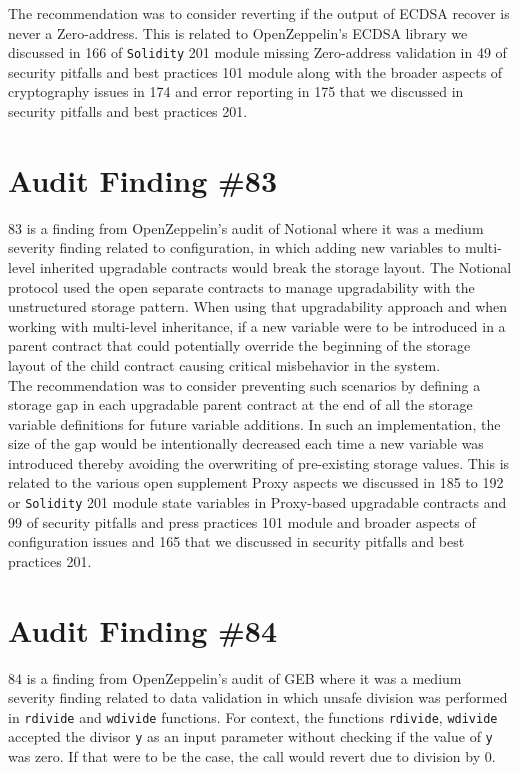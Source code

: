 The recommendation was to consider reverting if the output of ECDSA recover is never a Zero-address. This is related to OpenZeppelin's ECDSA library we discussed in 166 of \verb|Solidity| 201 module missing Zero-address validation in 49 of security pitfalls and best practices 101 module along with the broader aspects of cryptography issues in 174 and error reporting in 175 that we discussed in security pitfalls and best practices 201.

\section{Audit Finding \#83}

83 is a finding from OpenZeppelin's audit of Notional where it was a medium severity finding related to configuration, in which adding new variables to multi-level inherited upgradable contracts would break the storage layout. The Notional protocol used the open separate contracts to manage upgradability with the unstructured storage pattern. When using that upgradability approach and when working with multi-level inheritance, if a new variable were to be introduced in a parent contract that could potentially override the beginning of the storage layout of the child contract causing critical misbehavior in the system.\\

The recommendation was to consider preventing such scenarios by defining a storage gap in each upgradable parent contract at the end of all the storage variable definitions for future variable additions. In such an implementation, the size of the gap would be intentionally decreased each time a new variable was introduced thereby avoiding the overwriting of pre-existing storage values. This is related to the various open supplement Proxy aspects we discussed in 185 to 192 or \verb|Solidity| 201 module state variables in Proxy-based upgradable contracts and 99 of security pitfalls and press practices 101 module and broader aspects of configuration issues and 165 that we discussed in security pitfalls and best practices 201.

\section{Audit Finding \#84}

84 is a finding from OpenZeppelin's audit of GEB where it was a medium severity finding related to data validation in which unsafe division was performed in \verb|rdivide| and \verb|wdivide| functions. For context, the functions \verb|rdivide|, \verb|wdivide| accepted the divisor \verb|y| as an input parameter without checking if the value of \verb|y| was zero. If that were to be the case, the call would revert due to division by 0.\\

